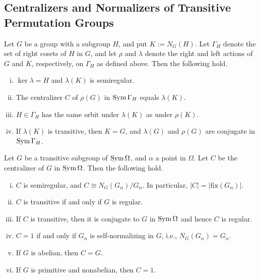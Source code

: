 \subsection{Centralizers and Normalizers of Transitive Permutation \break Groups}
\begin{lemma}
	Let $G$ be a group with a subgroup $H$, and put $K := N_G(H)$. Let $\Gamma_H$ denote the set of right cosets of $H$ in $G$, and let $\rho$ and $\lambda$ denote the right and left actions of $G$ and $K$, respectively, on $\Gamma_H$ as defined above. Then the following hold.
\begin{enumerate}[(i)]
\item $\ker \lambda = H$ and $\lambda(K)$ is semiregular.
\item The centralizer $C$ of $\rho(G)$ in $\operatorname{Sym}\Gamma_H$ equals $\lambda(K)$.
\item $H \in \Gamma_H$ has the same orbit under $\lambda(K)$ as under $\rho(K)$.
\item If $\lambda(K)$ is transitive, then $K = G$, and $\lambda(G)$ and $\rho(G)$ are conjugate in $\operatorname{Sym}\Gamma_H$.
\end{enumerate}
\end{lemma}
\begin{sketch}
	
\end{sketch}

\begin{theorem}
	Let $G$ be a transitive subgroup of $\operatorname{Sym}\Omega$, and $\alpha$ a point in $\Omega$. Let $C$ be the centralizer of $G$ in $\operatorname{Sym}\Omega$. Then the following hold.
	\begin{enumerate}[(i)]
		\item $C$ is semiregular, and $C \cong N_G(G_\alpha)/G_\alpha$. In particular, $|C| = |\text{fix}(G_\alpha)|$.
		\item $C$ is transitive if and only if $G$ is regular.
		\item If $C$ is transitive, then it is conjugate to $G$ in $\operatorname{Sym}\Omega$ and hence $C$ is regular.
		\item $C = 1$ if and only if $G_\alpha$ is self-normalizing in $G$, i.e., $N_G(G_\alpha) = G_\alpha$.
		\item If $G$ is abelian, then $C = G$.
		\item If $G$ is primitive and nonabelian, then $C = 1$.
	\end{enumerate}
\end{theorem}
\begin{sketch}
	
\end{sketch}


